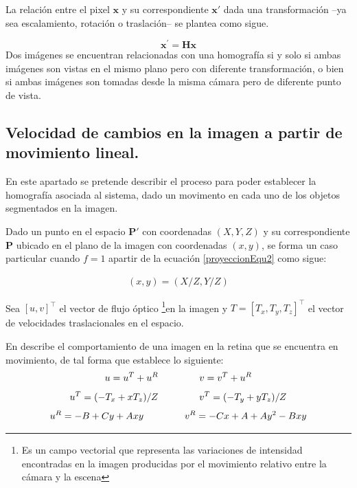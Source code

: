 La relación entre el pixel $\mathbf{x}$ y su correspondiente $\mathbf{x'}$ dada una transformación --ya sea escalamiento, rotación o traslación-- se plantea como sigue.

\begin{equation}
    \mathbf{x}^\prime =\mathbf{H}\mathbf{x}
\end{equation}
Dos imágenes se encuentran relacionadas con una homografía si y solo si ambas imágenes son vistas en el mismo plano pero con diferente transformación, o bien si ambas imágenes son tomadas desde la misma cámara pero de diferente punto de vista.


\subsection{Velocidad de cambios en la imagen a partir de movimiento lineal.}
En este apartado se pretende describir el proceso para poder establecer la homografía asociada al sistema, dado un movimento en cada uno de los objetos segmentados en la imagen. 

Dado un punto en el espacio $\mathbf{P'}$ con coordenadas $(X,Y,Z)$ y su correspondiente $\mathbf{P}$ ubicado en el plano de la imagen con coordenadas $(x,y)$, se forma un caso particular cuando $f = 1$ apartir de la ecuación \ref{proyeccionEqu2} como sigue:

\begin{equation}
    \label{equ::planoSpace}
    \begin{aligned}
        (x,y) = (X/Z, Y/Z)
    \end{aligned}
\end{equation}


Sea $[u,v]^\top$ el vector de flujo óptico \footnote{Es un campo vectorial que representa las variaciones de intensidad encontradas en la imagen producidas por el movimiento relativo entre la cámara y la escena}en la imagen y  $T = [T_x,T_y,T_z]^\top$ el vector de velocidades traslacionales en el espacio. 


En \citet{Ullman1979} describe el comportamiento de una imagen en la retina que se encuentra en movimiento, de tal forma que establece lo siguiente:
\begin{equation}
    \begin{aligned}
        u = u^T + u^R \hspace{1.5cm} v = v^T + u^R
    \end{aligned}
    \label{equ:velRelacionTrasRot}
\end{equation}
\begin{equation}
    \begin{aligned}
        u^T = (-T_x +xT_z)/Z \hspace{1.5cm} v^T = (-T_y+yT_z)/Z 
    \end{aligned}
    \label{equ:velTraslacional}
\end{equation}
\begin{equation}
    \begin{aligned}
        u^R = -B + Cy + Axy \hspace{1.5cm} v^R = -Cx + A + Ay^2 - Bxy 
    \end{aligned}
    \label{equ:velRotacional}
\end{equation}

